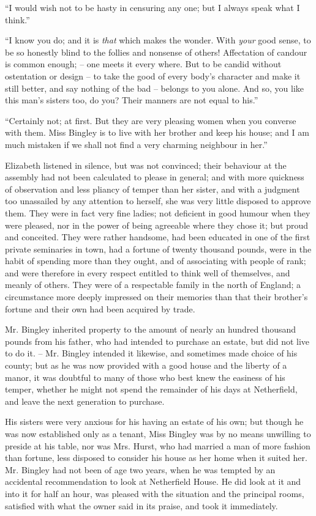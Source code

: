 “I would wish not to be hasty in censuring any one;
but I always speak what I think.”

“I know you do; and it is \textit{that} which makes the wonder.
With \textit{your} good sense, to be so honestly blind to the follies
and nonsense of others! Affectation of candour is common
enough; -- one meets it every where. But to be candid
without ostentation or design -- to take the good of every
body’s character and make it still better, and say nothing
of the bad -- belongs to you alone. And so, you like this
man’s sisters too, do you? Their manners are not equal
to his.”

“Certainly not; at first. But they are very pleasing
women when you converse with them. Miss Bingley
is to live with her brother and keep his house; and I am
much mistaken if we shall not find a very charming
neighbour in her.”

Elizabeth listened in silence, but was not convinced;
their behaviour at the assembly had not been calculated
to please in general; and with more quickness of observation
and less pliancy of temper than her sister, and
with a judgment too unassailed by any attention to herself,
she was very little disposed to approve them. They were
in fact very fine ladies; not deficient in good humour
when they were pleased, nor in the power of being agreeable
where they chose it; but proud and conceited. They
were rather handsome, had been educated in one of the
first private seminaries in town, had a fortune of twenty
thousand pounds, were in the habit of spending more than
they ought, and of associating with people of rank; and
were therefore in every respect entitled to think well of
themselves, and meanly of others. They were of a respectable
family in the north of England; a circumstance more
deeply impressed on their memories than that their
brother’s fortune and their own had been acquired by
trade.

Mr. Bingley inherited property to the amount of nearly
an hundred thousand pounds from his father, who had
intended to purchase an estate, but did not live to do it. --
Mr. Bingley intended it likewise, and sometimes made
choice of his county; but as he was now provided with
a good house and the liberty of a manor, it was doubtful
to many of those who best knew the easiness of his
temper, whether he might not spend the remainder of his
days at Netherfield, and leave the next generation to
purchase.

His sisters were very anxious for his having an estate
of his own; but though he was now established only as
a tenant, Miss Bingley was by no means unwilling to
preside at his table, nor was Mrs. Hurst, who had married
a man of more fashion than fortune, less disposed to
consider his house as her home when it suited her. Mr.
Bingley had not been of age two years, when he was
tempted by an accidental recommendation to look at
Netherfield House. He did look at it and into it for half
an hour, was pleased with the situation and the principal
rooms, satisfied with what the owner said in its praise,
and took it immediately.

